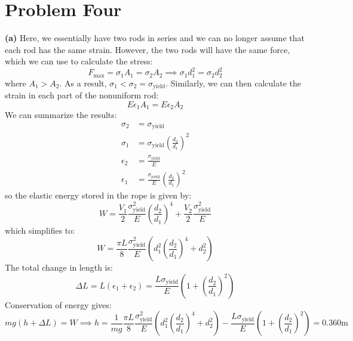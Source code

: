 \documentclass{article}
\begin{document}
\section{Problem Four}
\textbf{(a)} Here, we essentially have two rods in series and we can no longer assume that each rod has the same strain. However, the two rods will have the same force, which we can use to calculate the stress:
\begin{equation}
    F_\text{max}=\sigma_1A_1=\sigma_2A_2 \implies \sigma_1d_1^2=\sigma_2d_2^2
    \label{eq:}
\end{equation}
 where $A_1>A_2$. As a result, $\sigma_1 < \sigma_2 = \sigma_\text{yield}$. Similarly, we can then calculate the strain in each part of the nonuniform rod:
\begin{equation}
    E\epsilon_1A_1=E\epsilon_2A_2
    \label{eq:}
\end{equation}
We can summarize the results:
\begin{align}
    \sigma_2 &= \sigma_\text{yield} \\
    \sigma_1 &= \sigma_\text{yield}\left(\frac{d_2}{d_1}\right)^2 \\ 
    \epsilon_2 &= \frac{\sigma_\text{yield}}{E} \\ 
    \epsilon_1 &= \frac{\sigma_\text{yield}}{E}\left(\frac{d_2}{d_1}\right)^2
\end{align}
so the elastic energy stored in the rope is given by:
\begin{equation}
    W = \frac{V_1}{2}\frac{\sigma_\text{yield}^2}{E}\left(\frac{d_2}{d_1}\right)^4+\frac{V_2}{2}\frac{\sigma_\text{yield}^2}{E}
    \label{eq:}
\end{equation}
which simplifies to:
\begin{equation}
    W = \frac{\pi L}{8}\frac{\sigma_\text{yield}^2}{E}\left(d_1^2\left(\frac{d_2}{d_1}\right)^4+d_2^2\right)
    \label{eq:}
\end{equation}
The total change in length is:
\begin{equation}
    \Delta L = L(\epsilon_1+\epsilon_2)=\frac{L\sigma_\text{yield}}{E}\left(1+\left(\frac{d_2}{d_1}\right)^2\right)
    \label{eq:}
\end{equation}
Conservation of energy gives:
\begin{equation}
    mg(h+\Delta L)=W \implies h = \frac{1}{mg}\frac{\pi L}{8}\frac{\sigma_\text{yield}^2}{E}\left(d_1^2\left(\frac{d_2}{d_1}\right)^4+d_2^2\right)-\frac{L\sigma_\text{yield}}{E}\left(1+\left(\frac{d_2}{d_1}\right)^2\right)=\boxed{0.360\si{\meter}}
    \label{eq:cons}
\end{equation}
\end{document}
